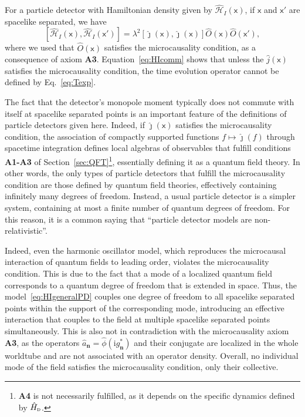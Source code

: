 \documentclass[letterpaper,12pt,titlepage,oneside,final]{book}
\newcommand{\mf}{\mathsf}%
\newcommand{\ii}{\mathrm{i}}
\newcommand{\tc}[1]{\textsc{#1}}
\begin{document}
For a particle detector with Hamiltonian density given by $\hat{\mathcal{H}}_I(\mf x)$, if $\mf x$ and $\mf x'$ are spacelike separated, we have
\begin{equation}\label{eq:HIcomm}
    [\hat{\mathcal{H}}_I(\mf x),\hat{\mathcal{H}}_I(\mf x')] = \lambda^2 [\hat{\jmath}(\mf x),\hat{\jmath}(\mf x)]\hat{O}(\mf x)\hat{O}(\mf x'),
\end{equation}
where we used that $\hat{O}(\mf x)$ satisfies the microcausality condition, as a consequence of axiom \textbf{A3}. Equation~\eqref{eq:HIcomm} shows that unless the $\hat{j}(\mf x)$ satisfies the microcausality condition, the time evolution operator cannot be defined by Eq.~\eqref{eq:Texp}.

The fact that the detector's monopole moment typically does not commute with itself at spacelike separated points is an important feature of the definitions of particle detectors given here. Indeed, if $\hat{\jmath}(\mf x)$ satisfies the microcausality condition, the association of compactly supported functions $f\mapsto\hat{\jmath}(f)$ through spacetime integration defines local algebras of observables that fulfill conditions \textbf{A1-A3} of Section~\ref{sec:QFT}\footnote{\textbf{A4} is not necessarily fulfilled, as it depends on the specific dynamics defined by $\hat{H}_\tc{d}$.}, essentially defining it as a quantum field theory. In other words, the only types of particle detectors that fulfill the microcausality condition are those defined by quantum field theories, effectively containing infinitely many degrees of freedom. Instead, a usual particle detector is a simpler system, containing at most a finite number of quantum degrees of freedom. For this reason, it is a common saying that ``particle detector models are non-relativistic''. 

Indeed, even the harmonic oscillator model, which reproduces the microcausal interaction of quantum fields to leading order, violates the microcausality condition. This is due to the fact that a mode of a localized quantum field corresponds to a quantum degree of freedom that is extended in space. Thus, the model~\eqref{eq:HIgeneralPD} couples one degree of freedom to all spacelike separated points within the support of the corresponding mode, introducing an effective interaction that couples to the field at multiple spacelike separated points simultaneously. This is also not in contradiction with the microcausality axiom \textbf{A3}, as the operators $\hat{a}_{\bm n} = \hat{\phi}(\ii g_{\bm n}^*)$ and their conjugate are localized in the whole worldtube and are not associated with an operator density. Overall, no individual mode of the field satisfies the microcausality condition, only their collective. 
\end{document}
